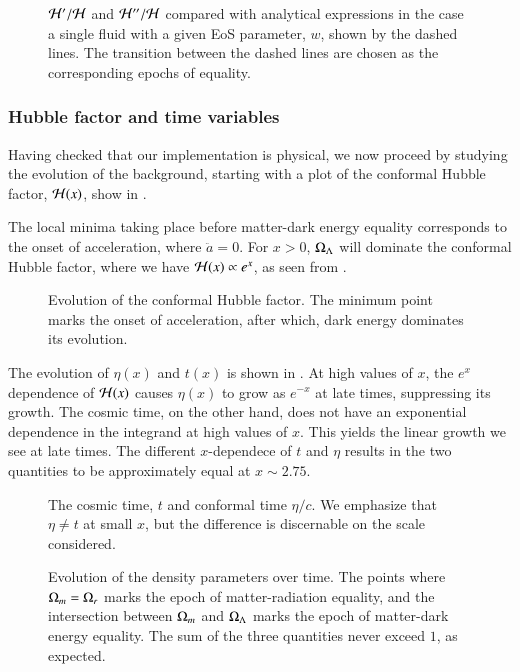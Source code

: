 \begin{figure}[ht!]
    \caption{$\mathcal{H}'/\mathcal{H}$ and $\mathcal{H}''/\mathcal{H}$ compared with analytical expressions in the case a single fluid with a given EoS parameter, $w$, shown by the dashed lines. The transition between the dashed lines are chosen as the corresponding epochs of equality.}
    \label{fig:M1:results:dH_and_ddH_over_H}
\end{figure}


\subsubsection{Hubble factor and time variables}
Having checked that our implementation is physical, we now proceed by studying the evolution of the background, starting with a plot of the conformal Hubble factor, $\mathcal{H}(x)$, show in .

The local minima taking place before matter-dark energy equality corresponds to the onset of acceleration, where $\ddot{a}=0$. For $x>0$, $\Omega_{\Lambda}$ will dominate the conformal Hubble factor, where we have $\mathcal{H}(x)\propto e^x$, as seen from . 
\begin{figure}[ht!]
    \caption{Evolution of the conformal Hubble factor. The minimum point marks the onset of acceleration, after which, dark energy dominates its evolution.}
    \label{fig:M1:results:compare_Hp}
\end{figure}

The evolution of $\eta(x)$ and $t(x)$ is shown in . At high values of $x$, the $e^x$ dependence of $\mathcal{H}(x)$ causes $\eta(x)$ to grow as $e^{-x}$ at late times, suppressing its growth. The cosmic time, on the other hand, does not have an exponential dependence in the integrand at high values of $x$. This yields the linear growth we see at late times. The different $x$-dependece of $t$ and $\eta$ results in the two quantities to be approximately equal at $x\sim2.75$.    


\begin{figure}[ht!]
    \caption{The cosmic time, $t$ and conformal time $\eta/c$. We emphasize that $\eta\neq t$ at small $x$, but the difference is discernable on the scale considered.}
    \label{fig:M1:results:t_and_eta_c}
\end{figure}


\begin{figure}[ht!]
    \caption{Evolution of the density parameters over time. The points where $\Omega_{m}=\Omega_{r}$ marks the epoch of matter-radiation equality, and the intersection between $\Omega_{m}$ and $\Omega_{\Lambda}$ marks the epoch of matter-dark energy equality. The sum of the three quantities never exceed $1$, as expected.}
    \label{fig:M1:results:omega_i_of_x}
\end{figure}



